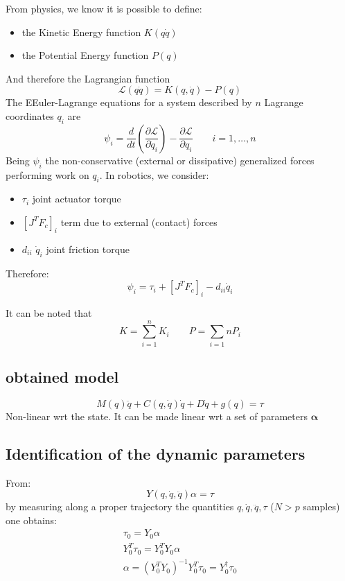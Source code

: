 \documentclass{book}
\begin{document}
From physics, we know it is possible to define:
\begin{itemize}
    \item the Kinetic Energy function $K(q\dot{q})$
    \item the Potential Energy function $P(q)$
\end{itemize}
And therefore the Lagrangian function 
\[
    \mathcal{L}(q\dot{q})=K(q,\dot{q})-P(q)
\]
The EEuler-Lagrange equations for a system described by $n$ Lagrange coordinates $q_i$ are
\[
    \psi_i=\frac{d}{dt}\left(\frac{\partial \mathcal{L}}{\partial \dot{q}_i}\right) - \frac{\partial \mathcal{L}}{\partial q_i} \qquad i=1,\dots,n
\]
Being $\psi_i$ the non-conservative (external or dissipative) generalized forces performing work on $q_i$. In robotics, we consider:
\begin{itemize}
    \item $\tau_i$ joint actuator torque
    \item $[J^TF_c]_i$ term due to external (contact) forces
    \item $d_{ii}$ $\dot{q}_i$ joint friction torque
\end{itemize}
Therefore:
\[
    \psi_i=\tau_i+[J^TF_c]_i-d_{ii}\dot{q}_i
\]

It can be noted that
\[
    K=\sum_{i=1}^{n}K_i \qquad P=\sum_{i=1}{n}P_i
\]





\subsection{obtained model}
\[
    M(q)\ddot{q} + C(q,\dot{q})\dot{q}+D\dot{q}+g(q)=\tau
\]
Non-linear wrt the state. It can be made linear wrt a set of parameters $\mathbf{\alpha}$

















\subsection{Identification of the dynamic parameters}
From:
\[
    Y(q,\dot{q},\ddot{q})\alpha = \tau
\]
by measuring along a proper trajectory the quantities $q,\dot{q},\ddot{q}, \tau$ ($N>p$ samples) one obtains:
\begin{gather*}
    \tau_0=Y_0\alpha\\
    Y_0^T\tau_0 = Y_0^TY_0\alpha\\
    \alpha = (Y_0^TY_0)^{-1}Y_0^T\tau_0=Y_0^\dag \tau_0
\end{gather*}
\end{document}
